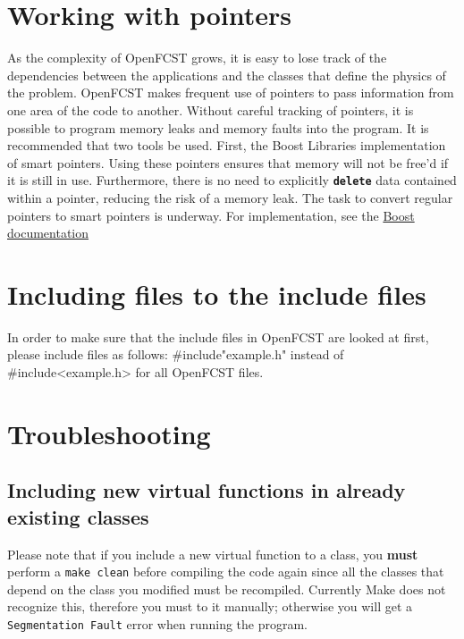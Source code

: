 \section{Working with pointers}

As the complexity of OpenFCST grows, it is easy to lose track of the dependencies between the applications and the classes that define the physics of the problem.  OpenFCST makes frequent use of pointers to pass information from one area of the code to another.  Without careful tracking of pointers, it is possible to program memory leaks and memory faults into the program.  It is recommended that two tools be used.  First, the Boost Libraries implementation of smart pointers.  Using these pointers ensures that memory will not be free'd if it is still in use.  Furthermore, there is no need to explicitly \textbf{\texttt{delete}} data contained within a pointer, reducing the risk of a memory leak.  The task to convert regular pointers to smart pointers is underway.  For implementation, see the \href{http://www.boost.org/doc/libs/1_46_1/libs/smart_ptr/smart_ptr.htm}{Boost documentation}

\section{Including files to the include files}

In order to make sure that the include files in OpenFCST are looked at first, please include files as follows: \#include"example.h" instead of \#include<example.h> for all OpenFCST files.

\section{Troubleshooting}

\subsection{Including new virtual functions in already existing classes}
Please note that if you include a new virtual function to a class, you \textbf{must} perform a \texttt{make clean} before compiling the code again since all the classes that depend on the class you modified must be recompiled. Currently Make does not recognize this, therefore you must to it manually; otherwise you will get a \texttt{Segmentation Fault} error when running the program.

